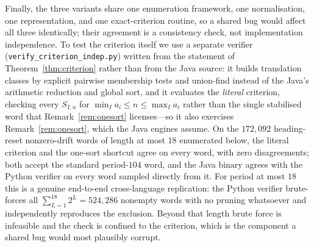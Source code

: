 \documentclass[11pt,reqno]{amsart}
\theoremstyle{plain}
\theoremstyle{definition}
\begin{document}
Finally, the three variants share one enumeration framework, one normalisation, one
representation, and one exact-criterion routine, so a shared bug would affect all
three identically; their agreement is a consistency check, not implementation
independence. To test the criterion itself we use a separate verifier
(\texttt{verify\_criterion\_indep.py}) written from the statement of
Theorem~\ref{thm:criterion} rather than from the Java source: it builds translation
classes by explicit pairwise membership tests and union-find instead of the Java's
arithmetic reduction and global sort, and it evaluates the \emph{literal} criterion,
checking every $S_{I,n}$ for $\min_I a_i\le n\le\max_I a_i$ rather than the single
stabilised word that Remark~\ref{rem:onesort} licenses---so it also exercises
Remark~\ref{rem:onesort}, which the Java engines assume. On the $172{,}092$
heading-reset nonzero-drift words of length at most $18$ enumerated below, the literal
criterion and the one-sort shortcut agree on every word, with zero disagreements; both
accept the standard period-$104$ word, and the Java binary agrees with the Python
verifier on every word sampled directly from it. For period at most $18$ this is a
genuine end-to-end cross-language replication: the Python verifier brute-forces all
$\sum_{L=1}^{18}2^L=524{,}286$ nonempty words with no pruning whatsoever and
independently reproduces the exclusion.
Beyond that length brute force is infeasible and the check is confined to the
criterion, which is the component a shared bug would most plausibly corrupt.
\end{document}
